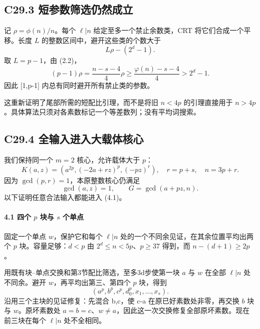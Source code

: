 \documentclass[11pt,a4paper]{article}
\theoremstyle{definition}
\numberwithin{equation}{section}
\begin{document}
\subsection*{\texorpdfstring{{C29.3} {短参数筛选仍然成立}}{C29.3 短参数筛选仍然成立}}\label{C29-h183}

{记} {\ensuremath{\rho =\phi (n)/n}。每个} {\ensuremath{\ell |n}} {给定至多一个禁止余数类，CRT} {将它们合成一个平移。长度} {\ensuremath{L}} {的整数区间中，避开这些类的个数大于} \[
L\rho-(2^d-1).
\] {取} {\ensuremath{L=p-1}，由} {(2.2)，} \[
(p-1)\rho
=\frac{n-s-4}{4}\rho
\ge\frac{\varphi(n)-s-4}{4}>2^d-1.
\tag{C29.3.1}
\] {因此} {{[}1,p-1{]}} {内总有同时避开所有禁止类的参数。}

{这重新证明了尾部所需的短配比引理，而不是将旧} {\ensuremath{n<4p}} {的引理直接用于} {\ensuremath{n>4p}。具体算法只须对各素数标记一个等差数列；没有平均词搜索。}

\subsection*{\texorpdfstring{{C29.4} {全输入进入大载体核心}}{C29.4 全输入进入大载体核心}}\label{C29-h184}

{我们保持同一个} {\ensuremath{m=2}} {核心，允许载体大于} {\ensuremath{p}：} \[
\boxed{
K(a,z)=(a^{2p},(-2a+rz)^p,(-pz)^r),\quad
r=p+s,\quad n=3p+r.}
\tag{C29.4.1}
\] {因为} {\ensuremath{\operatorname{gcd}(p,r)=1}，本原整数核心仍满足} \[
\gcd(a,z)=1,\qquad G=\gcd(a+pz,n).
\] {以下证明任意合法输入都能进入} {(4.1)。}

\paragraph*{\texorpdfstring{{4.1} {四个} {\ensuremath{p}} {块与} {\ensuremath{s}} {个单点}}{4.1 四个  块与  个单点}}\label{C29-h185}

{固定一个单点} {\ensuremath{w}，保护它和每个} {\ensuremath{\ell |n}} {处的一个不同余见证，在其余位置平均出两个} {\ensuremath{p}} {块。容量足够：\ensuremath{d<p}} {由} {\ensuremath{2^{d}\le n<5p}、\ensuremath{p\ge 37}} {得到，而} {\ensuremath{n-(d+1)\ge 2p}。}

{用既有块--单点交换和第3节配比筛选，至多3d步使第一块} {\ensuremath{a}} {与} {\ensuremath{w}} {在全部} {\ensuremath{\ell |n}} {处不同余。避开} {\ensuremath{w}，再平均出第三、第四个} {\ensuremath{p}} {块，得到} \[
(a^p,b^p,c^p,d_0^p,x_1,\ldots,x_s).
\] {沿用三个主块的见证修复：先混合} {b,c，使} {c-a} {在原已好素数处非零，再交换} {\ensuremath{b}} {块与} {\ensuremath{w}。原坏素数处} {\ensuremath{a=b=c}、\ensuremath{w\ne a}，因此这一次交换修复全部原坏素数。现在前三块在每个} {\ensuremath{\ell |n}} {处不全相同。}
\end{document}
